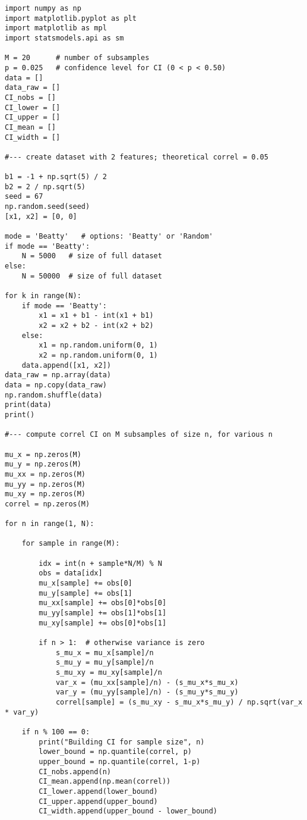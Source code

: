 \documentclass[oneside,10pt]{book}
\begin{document}
\begin{lstlisting}
import numpy as np
import matplotlib.pyplot as plt
import matplotlib as mpl
import statsmodels.api as sm

M = 20      # number of subsamples
p = 0.025   # confidence level for CI (0 < p < 0.50)
data = []
data_raw = []
CI_nobs = []
CI_lower = []
CI_upper = []
CI_mean = []
CI_width = []

#--- create dataset with 2 features; theoretical correl = 0.05

b1 = -1 + np.sqrt(5) / 2
b2 = 2 / np.sqrt(5)
seed = 67
np.random.seed(seed)
[x1, x2] = [0, 0]

mode = 'Beatty'   # options: 'Beatty' or 'Random'
if mode == 'Beatty':
    N = 5000   # size of full dataset
else:
    N = 50000  # size of full dataset

for k in range(N):
    if mode == 'Beatty':
        x1 = x1 + b1 - int(x1 + b1)
        x2 = x2 + b2 - int(x2 + b2)
    else:
        x1 = np.random.uniform(0, 1)
        x2 = np.random.uniform(0, 1)
    data.append([x1, x2])
data_raw = np.array(data)
data = np.copy(data_raw)
np.random.shuffle(data)
print(data)
print()

#--- compute correl CI on M subsamples of size n, for various n

mu_x = np.zeros(M)
mu_y = np.zeros(M)
mu_xx = np.zeros(M)
mu_yy = np.zeros(M)
mu_xy = np.zeros(M)
correl = np.zeros(M)

for n in range(1, N):

    for sample in range(M):

        idx = int(n + sample*N/M) % N
        obs = data[idx]
        mu_x[sample] += obs[0]
        mu_y[sample] += obs[1]
        mu_xx[sample] += obs[0]*obs[0]
        mu_yy[sample] += obs[1]*obs[1]
        mu_xy[sample] += obs[0]*obs[1]

        if n > 1:  # otherwise variance is zero
            s_mu_x = mu_x[sample]/n
            s_mu_y = mu_y[sample]/n
            s_mu_xy = mu_xy[sample]/n
            var_x = (mu_xx[sample]/n) - (s_mu_x*s_mu_x)
            var_y = (mu_yy[sample]/n) - (s_mu_y*s_mu_y)
            correl[sample] = (s_mu_xy - s_mu_x*s_mu_y) / np.sqrt(var_x * var_y)

    if n % 100 == 0:
        print("Building CI for sample size", n)
        lower_bound = np.quantile(correl, p)
        upper_bound = np.quantile(correl, 1-p)
        CI_nobs.append(n)
        CI_mean.append(np.mean(correl))
        CI_lower.append(lower_bound)
        CI_upper.append(upper_bound)
        CI_width.append(upper_bound - lower_bound)


\end{lstlisting}
\end{document}
